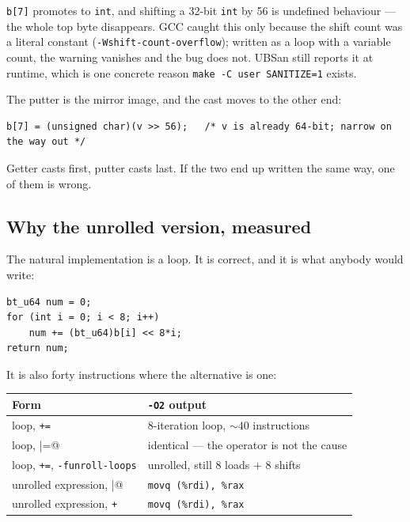 \lstinline|b[7]| promotes to \lstinline|int|, and shifting a 32-bit
\lstinline|int| by 56 is undefined behaviour --- the whole top byte disappears.
GCC caught this only because the shift count was a literal constant
(\lstinline|-Wshift-count-overflow|); written as a loop with a variable count,
the warning vanishes and the bug does not. UBSan still reports it at runtime,
which is one concrete reason \lstinline|make -C user SANITIZE=1| exists.

The putter is the mirror image, and the cast moves to the other end:

\begin{lstlisting}[style=c]
b[7] = (unsigned char)(v >> 56);   /* v is already 64-bit; narrow on the way out */
\end{lstlisting}

Getter casts first, putter casts last. If the two end up written the same way,
one of them is wrong.

\subsection{Why the unrolled version, measured}

The natural implementation is a loop. It is correct, and it is what anybody
would write:

\begin{lstlisting}[style=c]
bt_u64 num = 0;
for (int i = 0; i < 8; i++)
    num += (bt_u64)b[i] << 8*i;
return num;
\end{lstlisting}

It is also forty instructions where the alternative is one:

\begin{center}
\begin{tabular}{ll}
  \toprule
  Form & \lstinline|-O2| output \\
  \midrule
  loop, \lstinline|+=|                          & 8-iteration loop, ${\sim}40$ instructions \\
  loop, \lstinline@|=@                          & identical --- the operator is not the cause \\
  loop, \lstinline|+=|, \lstinline|-funroll-loops| & unrolled, still 8 loads $+$ 8 shifts \\
  unrolled expression, \lstinline@|@            & \lstinline|movq (%rdi), %rax| \\
  unrolled expression, \lstinline|+|            & \lstinline|movq (%rdi), %rax| \\
  \bottomrule
\end{tabular}
\end{center}

